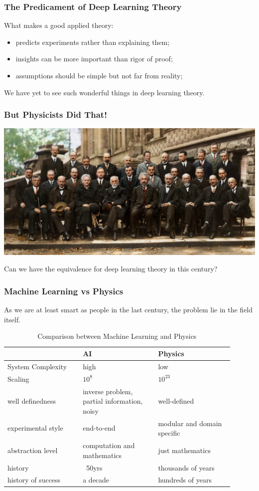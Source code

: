 \documentclass{beamer}   	%
\theoremstyle{definition}
\begin{document}
\begin{frame}
\frametitle{The Predicament of Deep Learning Theory}
What makes a good applied theory:
\begin{itemize}
	\item predicts experiments rather than explaining them;
	\item insights can be more important than rigor of proof;
	\item assumptions should be simple but not far from reality;
\end{itemize}

We have yet to see such wonderful things in deep learning theory.
\end{frame}

\begin{frame}
\frametitle{But Physicists Did That!}
\includegraphics[width=\linewidth]{physicists.jpg}

Can we have the equivalence for deep learning theory in this century?
\end{frame}

\begin{frame}
\frametitle{Machine Learning vs Physics}

As we are at least smart as people in the last century, the problem lie in the field itself.

\begin{table}[h]
\centering
\begin{tabular}{|>{\centering\arraybackslash}m{0.3\linewidth}|>{\centering\arraybackslash}m{0.3\linewidth}|>{\centering\arraybackslash}m{0.3\linewidth}|}
\hline
 & \textbf{AI} & \textbf{Physics} \\ 
\hline
System Complexity & high & low \\
\hline
Scaling & \(10^8\) & \(10^{23}\) \\
\hline
well definedness & inverse problem, partial information, noisy & well-defined \\
\hline
experimental style & end-to-end & modular and domain specific \\
\hline
abstraction level & computation and mathematics & just mathematics \\
\hline
history & ~50yrs & thousands of years \\
\hline
history of success & a decade & hundreds of years \\
\hline
\end{tabular}
\caption{Comparison between Machine Learning and Physics}
\label{table:comparison}
\end{table}
\end{frame}
\end{document}
